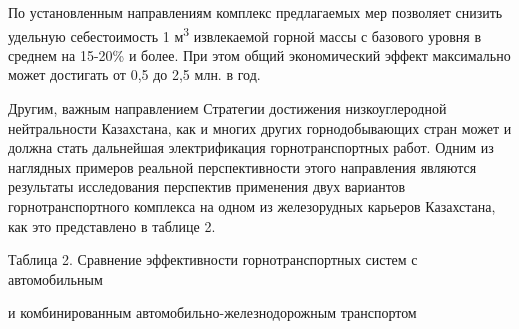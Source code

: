 По установленным направлениям комплекс предлагаемых мер позволяет
снизить удельную себестоимость 1 м\textsuperscript{3} извлекаемой горной
массы с базового уровня в среднем на 15-20\% и более. При этом общий
экономический эффект максимально может достигать от 0,5 до 2,5 млн. в
год.

Другим, важным направлением Стратегии достижения низкоуглеродной
нейтральности Казахстана, как и многих других горнодобывающих стран
может и должна стать дальнейшая электрификация горнотранспортных работ.
Одним из наглядных примеров реальной перспективности этого направления
являются результаты исследования перспектив применения двух вариантов
горнотранспортного комплекса на одном из железорудных карьеров
Казахстана, как это представлено в таблице 2.

Таблица 2. Сравнение эффективности горнотранспортных систем с
автомобильным

и комбинированным автомобильно-железнодорожным транспортом


